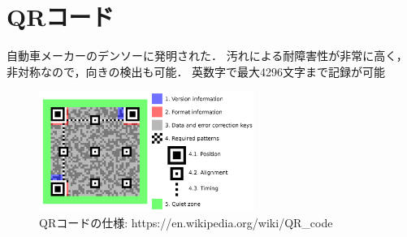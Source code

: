 \section{QRコード}
自動車メーカーのデンソーに発明された．
汚れによる耐障害性が非常に高く，非対称なので，向きの検出も可能．
英数字で最大4296文字まで記録が可能

\begin{figure}[htbp]
    \begin{center}
        \includegraphics[clip,width=7.0cm]{img/qrcode.png}
        \caption{QRコードの仕様: https://en.wikipedia.org/wiki/QR\_code }
    \end{center}
\end{figure}
